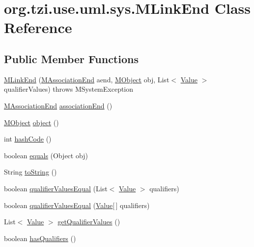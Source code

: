 \hypertarget{classorg_1_1tzi_1_1use_1_1uml_1_1sys_1_1_m_link_end}{\section{org.\-tzi.\-use.\-uml.\-sys.\-M\-Link\-End Class Reference}
\label{classorg_1_1tzi_1_1use_1_1uml_1_1sys_1_1_m_link_end}
}
\subsection*{Public Member Functions}
\begin{DoxyCompactItemize}
\item 
\hyperlink{classorg_1_1tzi_1_1use_1_1uml_1_1sys_1_1_m_link_end_a7ac694ddaaf83d8952dda2b18252137d}{M\-Link\-End} (\hyperlink{classorg_1_1tzi_1_1use_1_1uml_1_1mm_1_1_m_association_end}{M\-Association\-End} aend, \hyperlink{interfaceorg_1_1tzi_1_1use_1_1uml_1_1sys_1_1_m_object}{M\-Object} obj, List$<$ \hyperlink{classorg_1_1tzi_1_1use_1_1uml_1_1ocl_1_1value_1_1_value}{Value} $>$ qualifier\-Values)  throws M\-System\-Exception      
\item 
\hyperlink{classorg_1_1tzi_1_1use_1_1uml_1_1mm_1_1_m_association_end}{M\-Association\-End} \hyperlink{classorg_1_1tzi_1_1use_1_1uml_1_1sys_1_1_m_link_end_a3c4b88abbb96124f5e1a9d2daf190072}{association\-End} ()
\item 
\hyperlink{interfaceorg_1_1tzi_1_1use_1_1uml_1_1sys_1_1_m_object}{M\-Object} \hyperlink{classorg_1_1tzi_1_1use_1_1uml_1_1sys_1_1_m_link_end_a4f8461edb59ba0cdda436d49b5281bdb}{object} ()
\item 
int \hyperlink{classorg_1_1tzi_1_1use_1_1uml_1_1sys_1_1_m_link_end_a722be167fdc071ed940f255bc3b2300c}{hash\-Code} ()
\item 
boolean \hyperlink{classorg_1_1tzi_1_1use_1_1uml_1_1sys_1_1_m_link_end_afba97396c092a062e8829f4991f8b365}{equals} (Object obj)
\item 
String \hyperlink{classorg_1_1tzi_1_1use_1_1uml_1_1sys_1_1_m_link_end_aa9635504495c4619c70b1e06abb6049f}{to\-String} ()
\item 
boolean \hyperlink{classorg_1_1tzi_1_1use_1_1uml_1_1sys_1_1_m_link_end_a7a9156da1fe2c8328b9724b30d65c6af}{qualifier\-Values\-Equal} (List$<$ \hyperlink{classorg_1_1tzi_1_1use_1_1uml_1_1ocl_1_1value_1_1_value}{Value} $>$ qualifiers)
\item 
boolean \hyperlink{classorg_1_1tzi_1_1use_1_1uml_1_1sys_1_1_m_link_end_a39f0f6386a13cf64a875f6379dd63787}{qualifier\-Values\-Equal} (\hyperlink{classorg_1_1tzi_1_1use_1_1uml_1_1ocl_1_1value_1_1_value}{Value}\mbox{[}$\,$\mbox{]} qualifiers)
\item 
List$<$ \hyperlink{classorg_1_1tzi_1_1use_1_1uml_1_1ocl_1_1value_1_1_value}{Value} $>$ \hyperlink{classorg_1_1tzi_1_1use_1_1uml_1_1sys_1_1_m_link_end_a5df7e449cc642ab9eb5c4090c348127c}{get\-Qualifier\-Values} ()
\item 
boolean \hyperlink{classorg_1_1tzi_1_1use_1_1uml_1_1sys_1_1_m_link_end_a336d4302f6a78bffab358761ad31ba27}{has\-Qualifiers} ()
\end{DoxyCompactItemize}


